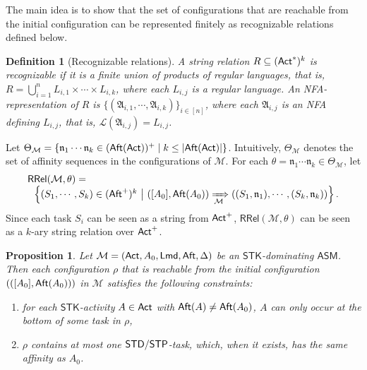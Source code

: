 \documentclass[preprint,12pt]{elsarticle}
\newtheorem{definition}{Definition}
\newtheorem{proposition}[theorem]{Proposition}
\newcommand\Mm{{\mathcal{M} }}
\newcommand\act{{\sf Act}}
\newcommand\aft{{\sf Aft}}
\newcommand\lmd{{\sf Lmd}}
\newcommand\standard{{\sf STD}}
\newcommand\singletop{{\sf STP}}
\newcommand{\AMASS}{\textsf{ASM}}
\newcommand{\LMAMASS}{\textsf{ASM}_\textsf{LM}}
\newcommand\aname{\mathfrak{n}}
\newcommand\RLang{\mathsf{RRel}}
\newcommand{\STK}{\mathsf{STK}}
\newcommand{\SIT}{\mathsf{SIT}}
\newcommand\Aut{{\mathfrak{A} }}
\newcommand\Lang{{\mathscr{L} }}
\newcommand{\PDS}{\textsf{PDS}}
\newcommand{\NFA}{\textsf{NFA}}
\begin{document}
The main idea is to show that the set of configurations that are reachable from the initial configuration can be represented finitely as recognizable relations defined below. 

\begin{definition}[Recognizable relations]
A string relation $R \subseteq (\act^*)^k$ is \emph{recognizable}  if it is a finite union of products of regular languages, that is, $R=\bigcup \limits_{i =1 }^n L_{i,1} \times \cdots \times L_{i, k}$, where each $L_{i,j}$ is a regular language. An {\NFA}-representation of $R$ is $\{(\Aut_{i,1},\cdots,\Aut_{i,k})\}_{i\in[n]}$, where each $\Aut_{i,j}$ is an {\NFA} defining $L_{i,j}$, that is, $\Lang(\Aut_{i,j}) = L_{i,j}$.
\end{definition}


Let $\Theta_\Mm = \left \{ \aname_1 \cdots \aname_k \in (\aft(\act))^+ \mid k \le |\aft(\act)| \right\}$. Intuitively, $\Theta_\Mm$ denotes the set of affinity sequences  in the configurations of $\Mm$. For each $\theta=\aname_1 \cdots \aname_k \in \Theta_\Mm$, let
%
$$
\begin{array}{l}
\RLang(\Mm, \theta) = \\
\ \ \left\{(S_1, \cdots, S_k) \in (\aft^+)^k\ \big{\vert}\  ([A_0], \aft(A_0)) \xRightarrow[\Mm]{} ((S_1, \aname_1), \cdots, (S_k, \aname_k)) \right\}.
\end{array}
$$ 
%
Since each task $S_i$ can be seen as a string from $\act^+$, $\RLang(\Mm, \theta)$ can be seen as a $k$-ary string relation over $\act^+$. 


\begin{proposition}\label{prop-stk}
	Let $\Mm=(\act,A_0,\lmd,\aft,\Delta)$ be an $\STK$-dominating $\AMASS$. Then each configuration $\rho$ that is reachable from the initial configuration $(([A_0],\aft(A_0)))$ in $\Mm$ satisfies the following constraints:
	\begin{enumerate}
		\item for each $\STK$-activity $A\in\act$ with $\aft(A)\neq\aft(A_0)$, $A$ can only occur at the bottom of some task in $\rho$, 
		\item $\rho$ contains at most one $\standard/\singletop$-task, which, when it exists, has the same affinity as $A_0$.
	\end{enumerate}
\end{proposition}
\end{document}

